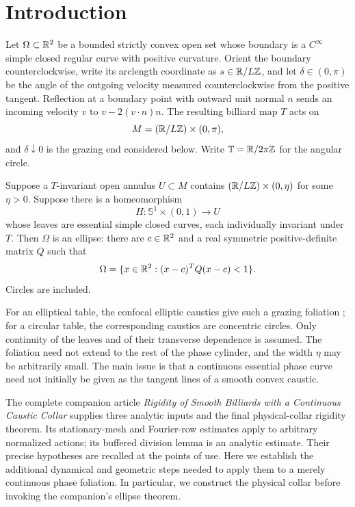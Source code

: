 \section{Introduction}\label{sec:introduction}

Let \(\Omega\subset\mathbb{R}^2\) be a bounded strictly convex open set whose
boundary is a \(C^\infty\) simple closed regular curve with positive
curvature. Orient the boundary counterclockwise, write its arclength
coordinate as \(s\in\mathbb{R}/L\mathbb Z\), and let \(\delta\in(0,\pi)\) be the
angle of the outgoing velocity measured counterclockwise from the
positive tangent. Reflection at a boundary point with outward unit
normal \(n\) sends an incoming velocity \(v\) to
\(v-2(v\cdot n)n\). The resulting billiard map \(T\) acts on
\[
M=(\mathbb{R}/L\mathbb Z)\times(0,\pi),
\]
and \(\delta\downarrow0\) is the grazing end considered below.
Write \(\mathbb{T}=\mathbb{R}/2\pi\mathbb Z\) for the angular circle.

\begin{theorem}\label{thm:main}
Suppose a \(T\)-invariant open annulus \(U\subset M\) contains
\((\mathbb{R}/L\mathbb Z)\times(0,\eta)\) for some \(\eta>0\).
Suppose there is a homeomorphism
\[
H:\mathbb S^1\times(0,1)\longrightarrow U
\]
whose leaves are essential simple closed curves, each individually
invariant under \(T\). Then \(\Omega\) is an ellipse: there are
\(c\in\mathbb{R}^2\) and a real symmetric positive-definite matrix \(Q\) such that
\[
\Omega=\{x\in\mathbb{R}^2:(x-c)^TQ(x-c)<1\}.
\]
Circles are included.
\end{theorem}

For an elliptical table, the confocal elliptic caustics give such a
grazing foliation \citep{Lazutkin1973}; for a circular table, the
corresponding caustics are concentric circles.
Only continuity of the leaves and of their transverse dependence is
assumed. The foliation need not extend to the rest of the phase cylinder,
and the width \(\eta\) may be arbitrarily small. The main issue is that a
continuous essential phase curve need not initially be given as the
tangent lines of a smooth convex caustic.

The complete companion article \emph{Rigidity of Smooth Billiards with a
Continuous Caustic Collar} \citep{NB} supplies three analytic inputs and
the final physical-collar rigidity theorem. Its stationary-mesh and
Fourier-row estimates apply to arbitrary normalized actions; its buffered
division lemma is an analytic estimate. Their precise hypotheses are
recalled at the points of use. Here we establish the additional dynamical
and geometric steps needed to apply them to a merely continuous phase
foliation. In particular, we construct the physical collar before invoking
the companion's ellipse theorem.


